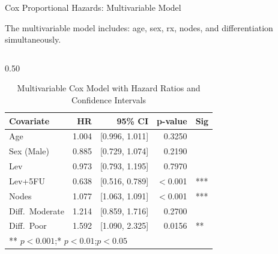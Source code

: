 \documentclass[aspectratio=169, 10pt]{beamer}
\begin{document}
\begin{frame}{Cox Proportional Hazards: Multivariable Model}

The multivariable model includes: age, sex, rx, nodes,
and differentiation simultaneously.

\bigskip
\begin{columns}[T]
  
  	\begin{column}{0.50\textwidth}
  		\begin{center}
  			\small
  			\begin{table}[ht]  %
  				\caption{Multivariable Cox Model with Hazard Ratios and Confidence Intervals}  %
  				\begin{tabular}{@{}lrrrl@{}}
  					     \toprule
  					     \textbf{Covariate} & \textbf{HR}
  					       & \textbf{95\% CI} & \textbf{p-value} & \textbf{Sig} \\
  					     \midrule
  					     Age              & 1.004 & [0.996, 1.011] & 0.3250 & \\
  					     Sex (Male)       & 0.885 & [0.729, 1.074] & 0.2190 & \\
  					     Lev              & 0.973 & [0.793, 1.195] & 0.7970 & \\
  					     \alert{Lev+5FU}  & \alert{0.638} & \alert{[0.516, 0.789]} & \alert{$<$0.001} & \alert{***} \\
  					     \alert{Nodes}    & \alert{1.077} & \alert{[1.063, 1.091]} & \alert{$<$0.001} & \alert{***} \\
  					     Diff.\ Moderate  & 1.214 & [0.859, 1.716] & 0.2700 & \\
  					     \alert{Diff.\ Poor} & \alert{1.592} & \alert{[1.090, 2.325]} & \alert{0.0156} & \alert{**} \\
  					     \bottomrule
  					     \multicolumn{5}{l}{\scriptsize *** $p<0.001$;\quad ** $p<0.01$;\quad * $p<0.05$}
  					   \end{tabular}
  			\end{table}
  		\end{center}
  	\end{column}
  


\end{columns}
\end{frame}
\end{document}
